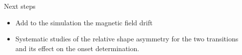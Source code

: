 \documentclass[8pt]{beamer}
\begin{document}
\begin{frame}
\begin{figure}
\centering
{}
\end{figure}
\end{frame}


\begin{frame}{Next steps}

\begin{itemize}
\item Add to the simulation the magnetic field drift
\item Systematic studies of the relative shape asymmetry for the two transitions and its effect on the onset determination.
\end{itemize}
\end{frame}
\end{document}
